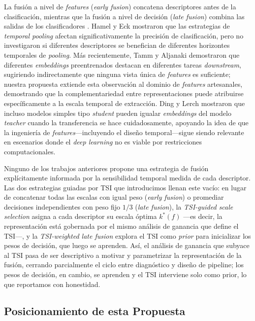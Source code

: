 \documentclass[conference]{IEEEtran}
\begin{document}
La fusión a nivel de \textit{features} (\textit{early fusion}) concatena descriptores antes de la clasificación, mientras que la fusión a nivel de decisión (\textit{late fusion}) combina las salidas de los clasificadores \cite{hamel2011temporal}.
Hamel y Eck \cite{hamel2011temporal} mostraron que las estrategias de  \textit{temporal pooling} afectan significativamente la precisión de clasificación, pero no investigaron si diferentes descriptores se benefician de diferentes horizontes temporales de \textit{pooling}.
Más recientemente, Tamm y Aljanaki \cite{tamm2024comparative} demostraron que diferentes \textit{embeddings} preentrenados destacan en 
diferentes tareas \textit{downstream}, sugiriendo indirectamente que ninguna vista única de \textit{features} es suficiente; nuestra propuesta extiende esta observación al dominio de \textit{features} artesanales, demostrando que la complementariedad entre representaciones 
puede atribuirse específicamente a la escala temporal de extracción.
Ding y Lerch \cite{ding2023audio} mostraron que incluso modelos simples tipo \textit{student} pueden igualar \textit{embeddings} del modelo \textit{teacher} cuando la transferencia se hace cuidadosamente, apoyando la idea de que la ingeniería de \textit{features}---incluyendo el diseño 
temporal---sigue siendo relevante en escenarios donde el \textit{deep learning} no es viable por restricciones computacionales.

Ninguno de los trabajos anteriores propone una estrategia de fusión explícitamente informada por la sensibilidad temporal medida de cada descriptor. Las dos estrategias guiadas por TSI que introducimos llenan este vacío: en lugar de concatenar todas las escalas con igual peso (\textit{early fusion}) o promediar decisiones independientes con peso fijo $1/3$ (\textit{late fusion}), la \textit{TSI-guided scale selection} asigna a cada descriptor su escala óptima $k^*(f)$ ---es decir, la representación está gobernada por el mismo análisis de ganancia que define el TSI---, y la \textit{TSI-weighted late fusion} explora el TSI como \emph{prior} para inicializar los pesos de decisión, que luego se aprenden. Así, el análisis de ganancia que subyace al TSI pasa de ser descriptivo a motivar y parametrizar la representación de la fusión, cerrando parcialmente el ciclo entre diagnóstico y diseño de pipeline; los pesos de decisión, en cambio, se aprenden y el TSI interviene solo como prior, lo que reportamos con honestidad.

\subsection{Posicionamiento de esta Propuesta}
\end{document}
